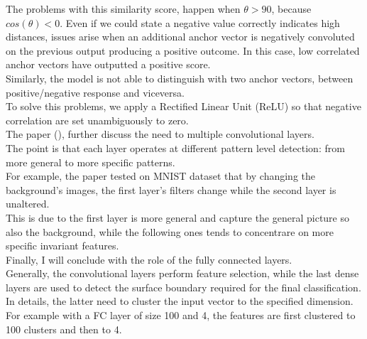 \documentclass[LaM,binding=0.6cm]{sapthesis}
\begin{document}
The problems with this similarity score, happen when $\theta>90$, because $cos(\theta)<0$. Even if we could state a negative value correctly indicates high distances, issues arise when an additional anchor vector is negatively convoluted on the previous output producing a positive outcome. In this case, low correlated anchor vectors have outputted a positive score.\\Similarly, the model is not able to distinguish with two anchor vectors, between positive/negative response and viceversa.\\To solve this problems, we apply a Rectified Linear Unit (ReLU) so that negative correlation are set unambiguously to zero.\\The paper (\cite{cnninter}), further discuss the need to multiple convolutional layers.\\The point is that each layer operates at different pattern level detection: from more general to more specific patterns.\\For example, the paper tested on MNIST dataset that by changing the background's images, the first layer's filters change while the second layer is unaltered.\\This is due to the first layer is more general and capture the general picture so also the background, while the following ones tends to concentrare on more specific invariant features.\\Finally, I will conclude with the role of the fully connected layers.\\Generally, the convolutional layers perform feature selection, while the last dense layers are used to detect the surface boundary required for the final classification.\\In details, the latter need to cluster the input vector  to the specified dimension. For example with a FC layer of size 100 and 4, the features are first clustered to 100 clusters and then to 4.
\end{document}
